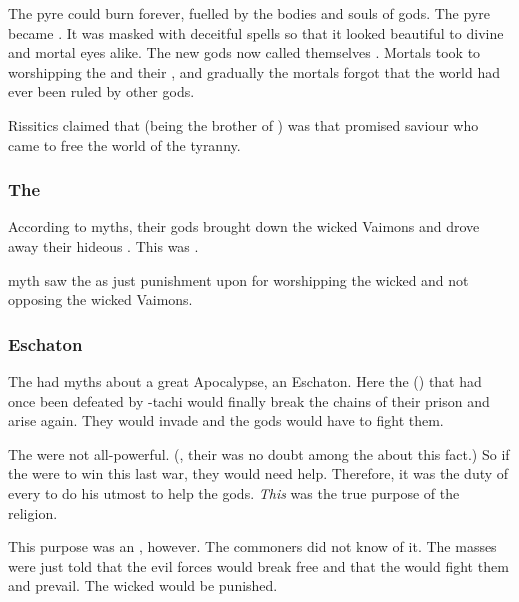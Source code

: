 The pyre could burn forever, fuelled by the bodies and souls of gods. 
The pyre became \iquin. 
It was masked with deceitful spells so that it looked beautiful to divine and mortal eyes alike.
The new gods now called themselves \sephiroth. 
Mortals took to worshipping the \sephiroth and their \iquin, and gradually the mortals forgot that the world had ever been ruled by other gods. 

Rissitics claimed that  (being the brother of ) was that promised saviour who came to free the world of the \iquinian tyranny. 





\subsubsection{The \HundredScourges}
According to \Ortaican myths, their gods brought down the wicked Vaimons and drove away their hideous \Archons. 
This was . 

\Ortaican myth saw the \HundredScourges as just punishment upon \Miithians for worshipping the wicked \Archons and not opposing the wicked Vaimons.





\subsubsection{Eschaton}
The \Ortaicans had myths about a great Apocalypse, an Eschaton. 
Here the  (\banes) that had once been defeated by \Sethicus-tachi would finally break the chains of their prison and arise again.
They would invade \Miith and the gods would have to fight them. 

The \taorthae were not all-powerful. 
(, their was no doubt among the \rethyaxes about this fact.)
So if the \taorthae were to win this last war, they would need help.
Therefore, it was the duty of every \rethyax to do his utmost to help the gods. 
\emph{This} was the true purpose of the \Ortaican religion. 

This purpose was an \arcanum, however. 
The commoners did not know of it.
The masses were just told that the evil forces would break free and that the \taorthae would fight them and prevail.
The wicked would be punished. 

